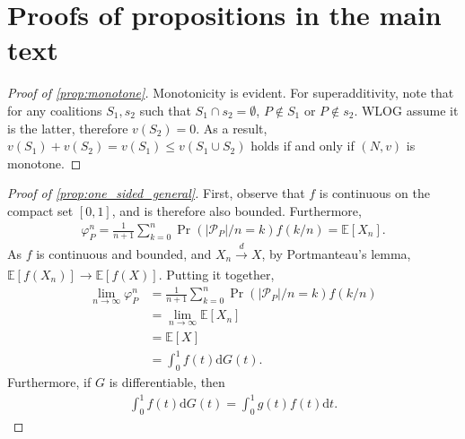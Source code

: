 \documentclass[a4paper]{article}
\newcommand{\dt}{\mathrm{d}t}
\newcommand{\dG}{\mathrm{d}G}
\newcommand{\E}{\mathbb{E}}
\begin{document}
\section{Proofs of propositions in the main text}
\label{sec:proofs}

\begin{proof}[Proof of \cref{prop:monotone}]
    Monotonicity is evident.
    For superadditivity, note that for any coalitions $S_1, s_2$ such that $S_1 \cap s_2 = \emptyset$, $P \notin S_1$ or $P \notin s_2$.
    WLOG assume it is the latter, therefore $v(S_2) = 0$.
    As a result, $v(S_1) + v(S_2) = v(S_1) \leq v(S_1 \cup S_2)$ holds if and only if $(N, v)$ is monotone.
\end{proof}

\begin{proof}[Proof of \cref{prop:one_sided_general}]
    First, observe that $f$ is continuous on the compact set $[0, 1]$, and is therefore also bounded.
    Furthermore,
    \begin{align*}
        \varphi_P^n = \frac{1}{n+1} \sum_{k=0}^n \Pr(|\mathcal{P}_P| / n = k) f(k/n) = \E[X_n].
    \end{align*}
    As $f$ is continuous and bounded, and $X_n \xrightarrow[]{d} X$, by Portmanteau's lemma, $\E[f(X_n)] \to \E[f(X)]$.
    Putting it together,
    \begin{align*}
        \lim_{n \to \infty} \varphi_P^n &= \frac{1}{n+1} \sum_{k=0}^n \Pr(|\mathcal{P}_P| / n = k) f(k/n) \\
        &= \lim_{n \to \infty} \E[X_n] \\
        &= \E[X] \\
        &= \int_0^1 f(t) \dG(t).
    \end{align*}
    Furthermore, if $G$ is differentiable, then
    \begin{align*}
        \int_0^1 f(t) \dG(t) = \int_0^1 g(t) f(t) \dt.
    \end{align*}
\end{proof}
\end{document}
